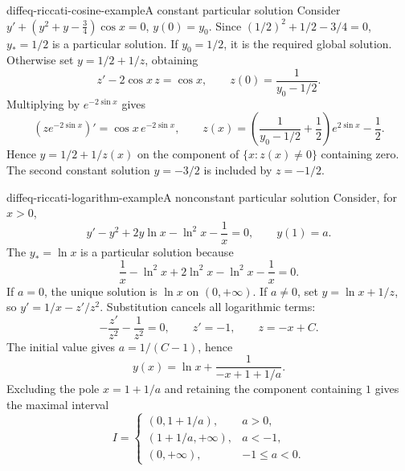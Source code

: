 \documentclass[preview]{standalone}
\begin{document}
\begin{snippetexample}{diffeq-riccati-cosine-example}{A constant particular solution}
    Consider \(y'+(y^2+y-\tfrac34)\cos x=0\), \(y(0)=y_0\).
    Since \((1/2)^2+1/2-3/4=0\), \(y_*=1/2\) is a particular solution.
    If \(y_0=1/2\), it is the required global solution.
    Otherwise set \(y=1/2+1/z\), obtaining
    \[
        z'-2\cos x\,z=\cos x,\qquad z(0)=\frac1{y_0-1/2}.
    \]
    Multiplying by \(e^{-2\sin x}\) gives
    \[
        (ze^{-2\sin x})'=\cos x\,e^{-2\sin x},
        \qquad
        z(x)=\left(\frac1{y_0-1/2}+\frac12\right)e^{2\sin x}-\frac12.
    \]
    Hence \(y=1/2+1/z(x)\) on the component of \(\{x:z(x)\neq0\}\)
    containing zero. The second constant solution \(y=-3/2\) is included
    by \(z=-1/2\).
\end{snippetexample}

\begin{snippetexample}{diffeq-riccati-logarithm-example}{A nonconstant particular solution}
    Consider, for \(x>0\),
    \[
        y'-y^2+2y\ln x-\ln^2x-\frac1x=0,\qquad y(1)=a.
    \]
    The \function \(y_*=\ln x\) is a particular solution because
    \[
        \frac1x-\ln^2x+2\ln^2x-\ln^2x-\frac1x=0.
    \]
    If \(a=0\), the unique solution is \(\ln x\) on \((0,+\infty)\).
    If \(a\neq0\), set \(y=\ln x+1/z\), so \(y'=1/x-z'/z^2\).
    Substitution cancels all logarithmic terms:
    \[
        -\frac{z'}{z^2}-\frac1{z^2}=0,\qquad
        z'=-1,\qquad z=-x+C.
    \]
    The initial value gives \(a=1/(C-1)\), hence
    \[
        y(x)=\ln x+\frac1{-x+1+1/a}.
    \]
    Excluding the pole \(x=1+1/a\) and retaining the component containing \(1\)
    gives the maximal interval
    \[
        I=\begin{cases}
          (0,1+1/a),&a>0,\\
          (1+1/a,+\infty),&a<-1,\\
          (0,+\infty),&-1\leq a<0.
        \end{cases}
    \]
\end{snippetexample}
\end{document}
